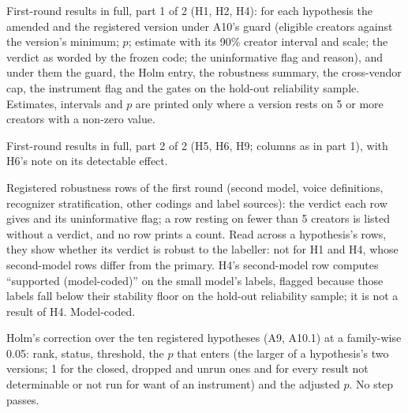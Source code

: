 \begin{table}[tp]
\centering
\small

\caption{First-round results in full, part 1 of 2 (H1, H2, H4): for each hypothesis the amended and the registered
version under A10's guard (eligible creators against the version's minimum; $p$; estimate with its 90\% creator interval
and scale; the verdict as worded by the frozen code; the uninformative flag and reason), and under them the guard, the
Holm entry, the robustness summary, the cross-vendor cap, the instrument flag and the gates on the hold-out reliability
sample. Estimates, intervals and $p$ are printed only where a version rests on 5 or more creators with a non-zero value.
\LabelValidity}
\label{tab:results-detail}
\end{table}

\begin{table}[tp]
\centering
\small

\caption{First-round results in full, part 2 of 2 (H5, H6, H9; columns as in part 1), with H6's note on its detectable
effect. \LabelValidity}
\label{tab:results-detail-b}
\end{table}

\begin{table}[tp]
\centering
\small

\caption{Registered robustness rows of the first round (second model, voice definitions, recognizer stratification,
other codings and label sources): the verdict each row gives and its uninformative flag; a row resting on fewer than 5
creators is listed without a verdict, and no row prints a count. Read across a hypothesis's rows, they show whether its
verdict is robust to the labeller: not for H1 and H4, whose second-model rows differ from the primary. H4's second-model
row computes ``supported (model-coded)'' on the small model's labels, flagged because those labels fall below their
stability floor on the hold-out reliability sample; it is not a result of H4. Model-coded. \LabelValidity}
\label{tab:results-rows}
\end{table}

\begin{table}[tp]
\centering
\small

\caption{Holm's correction over the ten registered hypotheses (A9, A10.1) at a family-wise 0.05: rank, status,
threshold, the $p$ that enters (the larger of a hypothesis's two versions; 1 for the closed, dropped and unrun ones and
for every result not determinable or not run for want of an instrument) and the adjusted $p$. No step passes. \LabelValidity}
\label{tab:results-holm}
\end{table}

